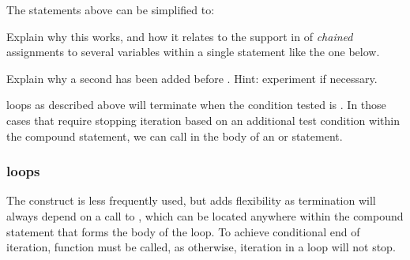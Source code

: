 \documentclass[krantz2]{krantz}\usepackage{knitr}
\begin{document}
\begin{advplayground}
The statements above can be simplified to:

\begin{knitrout}\footnotesize
{}\color{fgcolor}\begin{kframe}
\begin{alltt}
 \hlkwb{<-} 
  \hlopt{<} \hlstd{) \{}
   \hlkwb{<-} \hlopt{^}\hlstd{)}
\hlstd{\}}
\end{alltt}
\end{kframe}
\end{knitrout}

Explain why this works, and how it relates to the support in \Rlang of \emph{chained} assignments to several variables within a single statement like the one below.

\begin{knitrout}\footnotesize
{}\color{fgcolor}\begin{kframe}
\begin{alltt}
 \hlkwb{<-}  \hlkwb{<-}  \hlkwb{<-} \hlopt{:}
\end{alltt}
\end{kframe}
\end{knitrout}

Explain why a second  has been added before . Hint: experiment if necessary.
\end{advplayground}

\begin{explainbox}
 loops as described above will terminate when the condition tested is . In those cases that require stopping iteration based on an additional test condition within the compound statement, we can call  in the body of an  or  statement.
\end{explainbox}

\subsubsection[\texttt{repeat} loops]{ loops}
The  construct is less frequently used, but adds flexibility as termination will always depend on a call to , which can be located anywhere within the compound statement that forms the body of the loop. To achieve conditional end of iteration, function  must be called, as otherwise, iteration in a  loop will not stop.
\end{document}
